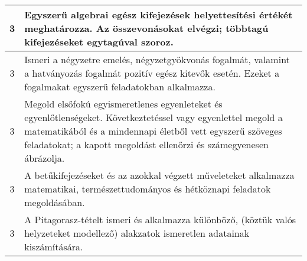 \begin{longtable}{c | p{12cm} }
                                
                                          3 &  Egyszerű algebrai egész kifejezések helyettesítési értékét meghatározza. Az összevonásokat elvégzi; többtagú kifejezéseket egytagúval szoroz. \\ \hline
                                          3 &  Ismeri a négyzetre emelés, négyzetgyökvonás fogalmát, valamint a hatványozás fogalmát pozitív egész kitevők esetén. Ezeket a fogalmakat egyszerű feladatokban alkalmazza. \\ \hline
                                          3 &  Megold elsőfokú egyismeretlenes egyenleteket és egyenlőtlenségeket. Következtetéssel vagy egyenlettel megold a matematikából és a mindennapi életből vett egyszerű szöveges feladatokat; a kapott megoldást ellenőrzi és számegyenesen ábrázolja. \\ \hline
                                          3 &  A betűkifejezéseket és az azokkal végzett műveleteket alkalmazza matematikai, természettudományos és hétköznapi feladatok megoldásában. \\ \hline
                                          3 &  A Pitagorasz-tételt ismeri és alkalmazza különböző, (köztük valós helyzeteket modellező) alakzatok ismeretlen adatainak kiszámítására. \\ \hline
                                      

\end{longtable}
